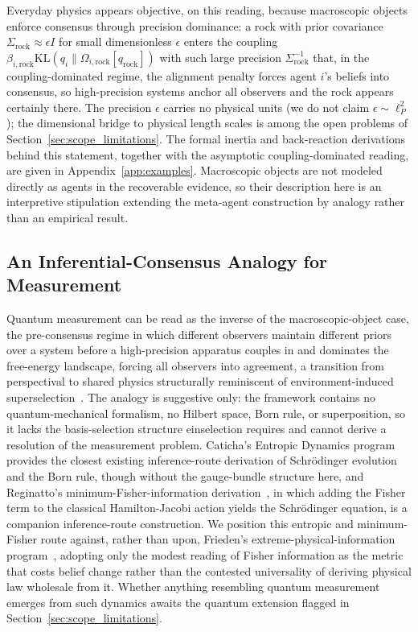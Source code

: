 \documentclass[11pt]{article}
\begin{document}
Everyday physics appears objective, on this reading, because macroscopic objects enforce consensus through precision dominance: a rock with prior covariance $\Sigma_{\mathrm{rock}} \approx \epsilon I$ for small dimensionless $\epsilon$ enters the coupling $\beta_{i,\mathrm{rock}} \mathrm{KL}(q_i \| \Omega_{i,\mathrm{rock}}[q_{\mathrm{rock}}])$ with such large precision $\Sigma_{\mathrm{rock}}^{-1}$ that, in the coupling-dominated regime, the alignment penalty forces agent $i$'s beliefs into consensus, so high-precision systems anchor all observers and the rock appears certainly there. The precision $\epsilon$ carries no physical units (we do not claim $\epsilon \sim \ell_P^2$); the dimensional bridge to physical length scales is among the open problems of Section~\ref{sec:scope_limitations}. The formal inertia and back-reaction derivations behind this statement, together with the asymptotic coupling-dominated reading, are given in Appendix~\ref{app:examples}. Macroscopic objects are not modeled directly as agents in the recoverable evidence, so their description here is an interpretive stipulation extending the meta-agent construction by analogy rather than an empirical result.

\subsection{An Inferential-Consensus Analogy for Measurement}
\label{sec:measurement_analogy}

Quantum measurement can be read as the inverse of the macroscopic-object case, the pre-consensus regime in which different observers maintain different priors over a system before a high-precision apparatus couples in and dominates the free-energy landscape, forcing all observers into agreement, a transition from perspectival to shared physics structurally reminiscent of environment-induced superselection~\cite{Zurek2003}. The analogy is suggestive only: the framework contains no quantum-mechanical formalism, no Hilbert space, Born rule, or superposition, so it lacks the basis-selection structure einselection requires and cannot derive a resolution of the measurement problem. Caticha's Entropic Dynamics program~\cite{Caticha2015, Caticha2019, JohnsonCaticha2011} provides the closest existing inference-route derivation of Schr\"odinger evolution and the Born rule, though without the gauge-bundle structure here, and Reginatto's minimum-Fisher-information derivation~\cite{reginatto1998derivation}, in which adding the Fisher term to the classical Hamilton-Jacobi action yields the Schr\"odinger equation, is a companion inference-route construction. We position this entropic and minimum-Fisher route against, rather than upon, Frieden's extreme-physical-information program~\cite{frieden1998physics}, adopting only the modest reading of Fisher information as the metric that costs belief change rather than the contested universality of deriving physical law wholesale from it. Whether anything resembling quantum measurement emerges from such dynamics awaits the quantum extension flagged in Section~\ref{sec:scope_limitations}.
\end{document}
